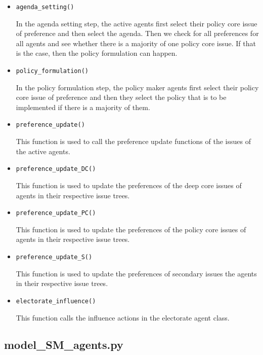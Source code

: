\begin{itemize}
\item \texttt{agenda\_setting()}

In the agenda setting step, the active agents first select their policy core issue of preference and then select the agenda. Then we check for all preferences for all agents and see whether there is a majority of one policy core issue. If that is the case, then the policy formulation can happen.
		
\item \texttt{policy\_formulation()}

In the policy formulation step, the policy maker agents first select their policy core issue of preference and then they select the policy that is to be implemented if there is a majority of them.

\item \texttt{preference\_update()}

This function is used to call the preference update functions of the issues of the active agents.

\item \texttt{preference\_update\_DC()}

This function is used to update the preferences of the deep core issues of agents in their respective issue trees.

\item \texttt{preference\_update\_PC()}

This function is used to update the preferences of the policy core issues of agents in their respective issue trees.
		
\item \texttt{preference\_update\_S()}

This function is used to update the preferences of secondary issues the agents in their respective issue trees.

\item \texttt{electorate\_influence()}

This function calls the influence actions in the electorate agent class.

\end{itemize}


\subsection{model\_SM\_agents.py}

